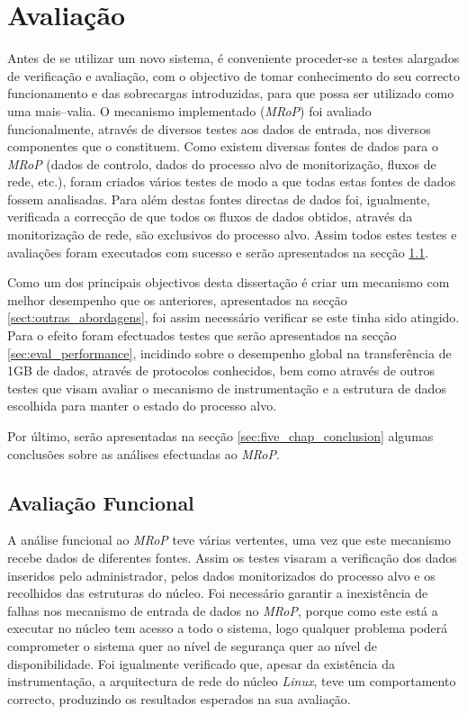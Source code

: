 \chapter{Avaliação}
\label{cap:avaliacao}

Antes de se utilizar um novo sistema, é conveniente proceder-se a testes alargados de verificação e avaliação, com o objectivo de tomar conhecimento do seu correcto funcionamento e das sobrecargas introduzidas, para que possa ser utilizado como uma mais–valia.
O mecanismo implementado (\textit{MRoP}) foi avaliado funcionalmente, através de diversos testes aos dados de entrada, nos diversos componentes que o constituem.
Como existem diversas fontes de dados para o \textit{MRoP} (dados de controlo, dados do processo alvo de monitorização, fluxos de rede, etc.), foram criados vários testes de modo a que todas estas fontes de dados fossem analisadas.
Para além destas fontes directas de dados foi, igualmente, verificada a correcção de que todos os fluxos de dados obtidos, através da monitorização de rede, são exclusivos do processo alvo.
Assim todos estes testes e avaliações foram executados com sucesso e serão apresentados na secção \ref{sec:eval_functional}.

Como um dos principais objectivos desta dissertação é criar um mecanismo com melhor desempenho que os anteriores, apresentados na secção \ref{sect:outras_abordagens}, foi assim necessário verificar se este tinha sido atingido.
Para o efeito foram efectuados testes que serão apresentados na secção \ref{sec:eval_performance}, incidindo sobre o desempenho global na transferência de 1GB de dados, através de protocolos conhecidos, bem como através de outros testes que visam avaliar o mecanismo de instrumentação e a estrutura de dados escolhida para manter o estado do processo alvo.

Por último, serão apresentadas na secção \ref{sec:five_chap_conclusion} algumas conclusões sobre as análises efectuadas ao \textit{MRoP}.

\section{Avaliação Funcional}
\label{sec:eval_functional}

A análise funcional ao \textit{MRoP} teve várias vertentes, uma vez que este mecanismo recebe dados de diferentes fontes.
Assim os testes visaram a verificação dos dados inseridos pelo administrador, pelos dados monitorizados do processo alvo e os recolhidos das estruturas do núcleo.
Foi necessário garantir a inexistência de falhas nos mecanismo de entrada de dados no \textit{MRoP}, porque como este está a executar no núcleo tem acesso a todo o sistema, logo qualquer problema poderá comprometer o sistema quer ao nível de segurança quer ao nível de disponibilidade.
Foi igualmente verificado que, apesar da existência da instrumentação, a arquitectura de rede do núcleo \textit{Linux}, teve um comportamento correcto, produzindo os resultados esperados na sua avaliação.

